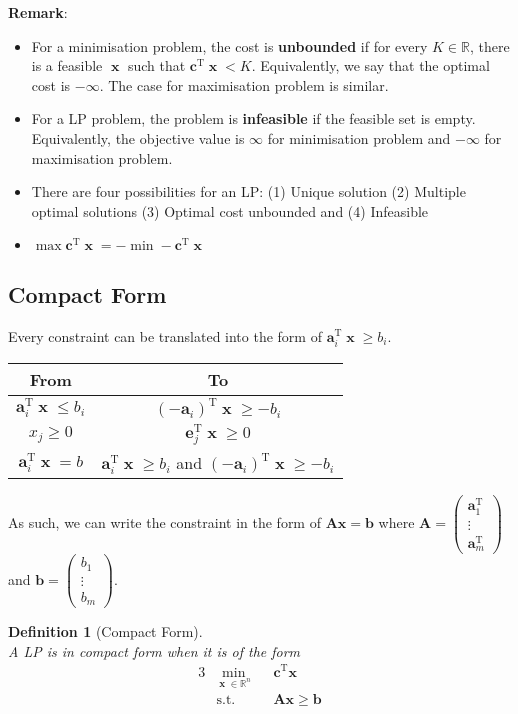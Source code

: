 \documentclass[12pt]{article}
\newcommand{\st}{\mathrm{s.t.}}
\newcommand{\T}{\mathrm{T}}
\newcommand{\va}{\mathbf{a}}
\newtheorem{definition}{Definition}[section]
\theoremstyle{definition}
\DeclareMathOperator{\x}{\mathbf{x}}
\begin{document}
\textbf{Remark}:
\begin{itemize}
  \item For a minimisation problem, the cost is \textbf{unbounded} if for every $K\in\mathbb{R}$, there is a feasible $\x$ such that $\mathbf{c}^\T\x<K$. Equivalently, we say that the optimal cost is $-\infty$. The case for maximisation problem is similar.
  \item For a LP problem, the problem is \textbf{infeasible} if the feasible set is empty. Equivalently, the objective value is $\infty$ for minimisation problem and $-\infty$ for maximisation problem.
  \item There are four possibilities for an LP: (1) Unique solution (2) Multiple optimal solutions (3) Optimal cost unbounded and (4) Infeasible
  \item $\max\mathbf{c}^\T\x=-\min-\mathbf{c}^\T\x$
\end{itemize}
\subsection{Compact Form}
Every constraint can be translated into the form of $\va_i^\T\x\geq b_i$.
\begin{table}[h]
\centering
\begin{tabular}{|c|c|}
\hline From & To \\\hline
$\va_i^\T\x\leq b_i$&$(-\va_i)^\T\x\geq -b_i$\\\hline
$x_j\geq 0$ & $\mathbf{e}_j^\T\x\geq 0$\\\hline
$\va_i^\T\x = b$ & $\va_i^\T\x\geq b_i$ and $(-\va_i)^\T\x\geq - b_i$\\\hline
\end{tabular}
\end{table}
As such, we can write the constraint in the form of $\mathbf{Ax}=\mathbf{b}$ where $\mathbf{A}=\begin{pmatrix}\va_1^\T\\\vdots\\\va_m^\T\end{pmatrix}$ and $\mathbf{b}=\begin{pmatrix} b_1\\\vdots\\b_m\end{pmatrix}$.
\begin{definition}[Compact Form]
\hfill\\\normalfont A LP is in compact form when it is of the form
\begin{alignat*}{3}
&\min_{\x\in\mathbb{R}^n}&& \mathbf{c}^\T\mathbf{x}\\
&\st&&\mathbf{Ax}\geq \mathbf{b}
\end{alignat*}
\end{definition}
\end{document}
